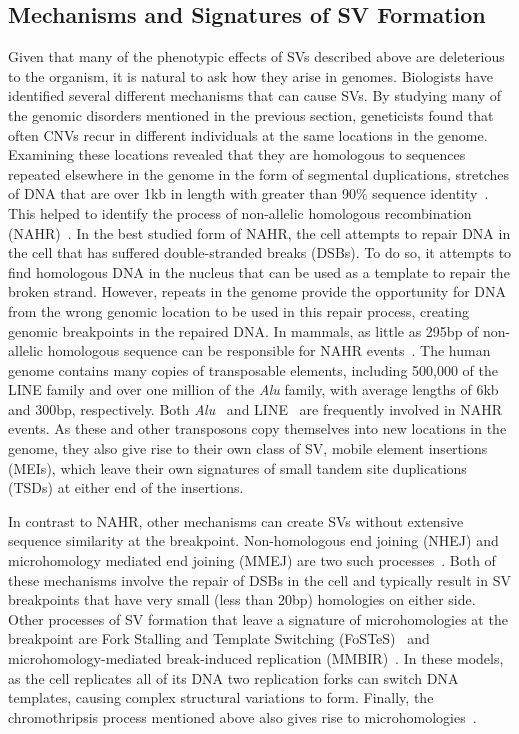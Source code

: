 \subsection{Mechanisms and Signatures of SV Formation}\label{section_sv_mechanisms}

Given that many of the phenotypic effects of SVs described above are deleterious to the organism, it is natural to ask how they arise in genomes. Biologists have identified several different mechanisms that can cause SVs. By studying many of the genomic disorders mentioned in the previous section, geneticists found that often CNVs recur in different individuals at the same locations in the genome. Examining these locations revealed that they are homologous to sequences repeated elsewhere in the genome in the form of segmental duplications, stretches of DNA that are over 1kb in length with greater than 90\% sequence identity~\cite{Sharp:2006fy}. This helped to identify the process of non-allelic homologous recombination (NAHR)~\cite{Liu:2012if}. In the best studied form of NAHR, the cell attempts to repair DNA in the cell that has suffered double-stranded breaks (DSBs). To do so, it attempts to find homologous DNA in the nucleus that can be used as a template to repair the broken strand. However, repeats in the genome provide the opportunity for DNA from the wrong genomic location to be used in this repair process, creating genomic breakpoints in the repaired DNA. In mammals, as little as 295bp of non-allelic homologous sequence can be responsible for NAHR events~\cite{Liskay:1987wt}. The human genome contains many copies of transposable elements, including 500,000 of the LINE family and over one million of the \emph{Alu} family, with average lengths of 6kb and 300bp, respectively. Both \emph{Alu}~\cite{Lehrman:1985tn} and LINE~\cite{Robberecht:2013kw} are frequently involved in NAHR events. As these and other transposons copy themselves into new locations in the genome, they also give rise to their own class of SV, mobile element insertions (MEIs), which leave their own signatures of small tandem site duplications (TSDs) at either end of the insertions.

In contrast to NAHR, other mechanisms can create SVs without extensive sequence similarity at the breakpoint. Non-homologous end joining (NHEJ) and microhomology mediated end joining (MMEJ) are two such processes~\cite{Hastings:2009fv}. Both of these mechanisms involve the repair of DSBs in the cell and typically result in SV breakpoints that have very small (less than 20bp) homologies on either side. Other processes of SV formation that leave a signature of microhomologies at the breakpoint are Fork Stalling and Template Switching (FoSTeS)~\cite{Lee:2007fy} and microhomology-mediated break-induced replication (MMBIR)~\cite{Hastings:2009fv}. In these models, as the cell replicates all of its DNA two replication forks can switch DNA templates, causing complex structural variations to form. Finally, the chromothripsis process mentioned above also gives rise to microhomologies~\cite{Liu:2011p1751}.

